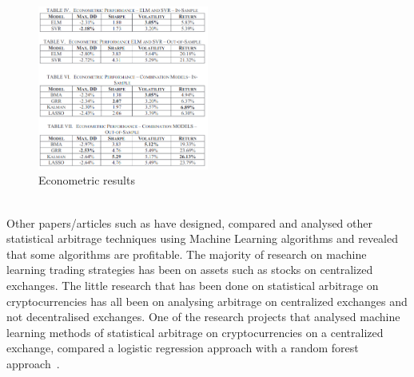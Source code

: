 \begin{figure}[htb!]
    \centering
    \includegraphics[width=0.5\textwidth]{background/Images/kalman_ml_results.png}
    \caption{Econometric results~\cite{6974093}}
    \label{fig:kalman_ml_results}
\end{figure}
\\[5mm]
Other papers/articles such as \cite{KRAUSS2017689, alma991000475380901591, jrfm12010031} have designed, compared and analysed other statistical arbitrage techniques using Machine Learning algorithms and revealed that some algorithms are profitable. The majority of research on machine learning trading strategies has been on assets such as stocks on centralized exchanges. The little research that has been done on statistical arbitrage on cryptocurrencies has all been on analysing arbitrage on centralized exchanges and not decentralised exchanges. One of the research projects that analysed machine learning methods of statistical arbitrage on cryptocurrencies on a centralized exchange, compared a logistic regression approach with a random forest approach~\cite{jrfm12010031}. 



